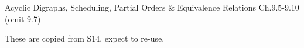 \documentclass[handout]{mcs}
\begin{document}

\begin{staffnotes}
Acyclic Digraphs, Scheduling, Partial Orders \& Equivalence Relations Ch.9.5-9.10 (omit 9.7)
\end{staffnotes}


\begin{staffnotes}
These are copied from S14, expect to re-use.
\end{staffnotes}











\end{document}
